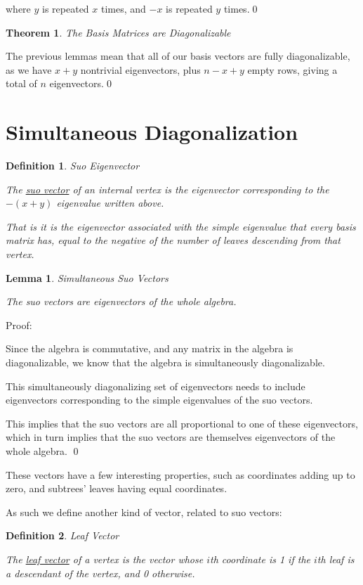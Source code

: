 \documentclass[10pt,a4paper]{report}
\newtheorem{definition}{Definition}
\newtheorem{theorem}{Theorem}
\newtheorem{lemma}{Lemma}
\begin{document}
where $y$ is repeated $x$ times, and $-x$ is repeated $y$ times.\qed{}

\begin{theorem} The Basis Matrices are Diagonalizable \end{theorem}

The previous lemmas mean that all of our basis vectors are fully
diagonalizable, as we have $x+y$ nontrivial eigenvectors, plus $n-x+y$ empty
rows, giving a total of $n$ eigenvectors.\qed{}

\section{Simultaneous Diagonalization}

\begin{definition} Suo Eigenvector

	The \underline{suo vector} of an internal vertex is the eigenvector
	corresponding to the $-(x+y)$ eigenvalue written above.

	That is it is the eigenvector associated with the simple eigenvalue that
	every basis matrix has, equal to the negative of the number of leaves
	descending from that vertex.
\end{definition}

\begin{lemma} Simultaneous Suo Vectors

	The suo vectors are eigenvectors of the whole algebra.
\end{lemma}
Proof:

Since the algebra is commutative, and any matrix in the algebra is
diagonalizable, we know that the algebra is simultaneously diagonalizable.

This simultaneously diagonalizing set of eigenvectors needs to include
eigenvectors corresponding to the simple eigenvalues of the suo vectors.

This implies that the suo vectors are all proportional to one of these
eigenvectors, which in turn implies that the suo vectors are themselves
eigenvectors of the whole algebra. \qed{}

These vectors have a few interesting properties, such as coordinates adding up
to zero, and subtrees' leaves having equal coordinates.

As such we define another kind of vector, related to suo vectors:

\begin{definition} Leaf Vector

	The \underline{leaf vector} of a vertex is the vector whose $i$th
	coordinate is 1 if the $i$th leaf is a descendant of the vertex, and 0
	otherwise.
\end{definition}
\end{document}
